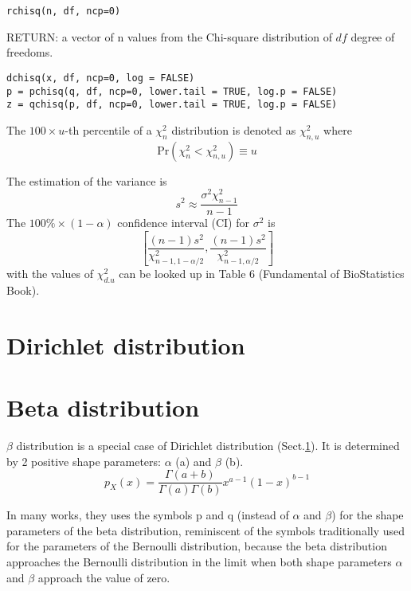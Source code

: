 \begin{verbatim}
rchisq(n, df, ncp=0)
\end{verbatim}
RETURN: a vector of n values from the Chi-square distribution of $df$
degree of freedoms.

\begin{verbatim}
dchisq(x, df, ncp=0, log = FALSE)
p = pchisq(q, df, ncp=0, lower.tail = TRUE, log.p = FALSE)
z = qchisq(p, df, ncp=0, lower.tail = TRUE, log.p = FALSE)
\end{verbatim}

The $100\times u$-th percentile of a $\chi_n^2$ distribution is
denoted as $\chi^2_{n,u}$ where
\begin{equation}
  \label{eq:34}
  \text{Pr}(\chi^2_{n} < \chi^2_{n,u}) \equiv u
\end{equation}

The estimation of the variance is
\begin{equation}
  \label{eq:35}
  s^2 \approx \frac{\sigma^2\chi^2_{n-1}}{n-1}
\end{equation}
The $100\%\times (1-\alpha)$ confidence interval (CI) for $\sigma^2$
is
\begin{equation}
  \label{eq:50}
  \left[ \frac{(n-1)s^2}{\chi^2_{n-1,1-\alpha/2}},
    \frac{(n-1)s^2}{\chi^2_{n-1,\alpha/2}} \right]
\end{equation}
with the values of $\chi^2_{d.u}$ can be looked up in Table 6
(Fundamental of BioStatistics Book). 


\section{Dirichlet distribution}
\label{sec:Dirichlet-distribution}




\section{Beta distribution}
\label{sec:beta-distribution}

$\beta$ distribution is a special case of Dirichlet distribution
(Sect.\ref{sec:Dirichlet-distribution}). It is determined by 2 positive shape
parameters: $\alpha$ (a) and $\beta$ (b).
\begin{equation}
  \label{eq:2}
  p_X(x) = \frac{\Gamma(a+b)}{\Gamma(a) \Gamma(b)} x^{a-1} (1-x)^{b-1}
\end{equation}

In many works, they uses the symbols p and q (instead of $\alpha$ and
$\beta$) for the shape parameters of the beta distribution, reminiscent of the
symbols traditionally used for the parameters of the Bernoulli distribution,
because the beta distribution approaches the Bernoulli distribution in the limit
when both shape parameters $\alpha$ and $\beta$ approach the value of zero.

